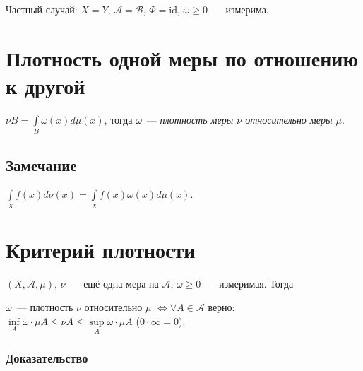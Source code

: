 \documentclass{article}
\begin{document}
            Частный случай: $X = Y$, $\mathcal{A} = \mathcal{B}$, $\Phi = \mathrm{id}$, $\omega \geqslant 0$~--- измерима.
            
    \newpage
    
    \section{Плотность одной меры по отношению к другой}
    
        $\nu B = \int\limits_B \omega(x) d \mu(x)$, тогда $\omega$~--- \textit{плотность меры $\nu$ относительно меры $\mu$}.
            
        \subsection{Замечание}
        
            $\int\limits_X f(x) d \nu(x) = \int\limits_X f(x) \omega(x) d \mu(x)$.
    
    \newpage
            
    \section{Критерий плотности}
    
        $(X, \mathcal{A}, \mu)$, $\nu$~--- ещё одна мера на $\mathcal{A}$, $\omega \geqslant 0$~--- измеримая. Тогда
        
        $\omega$~--- плотность $\nu$ относительно $\mu$ $\Longleftrightarrow \forall A \in \mathcal{A}$ верно: $\inf\limits_{A} \omega \cdot \mu A \leqslant \nu A \leqslant \sup\limits_{A} \omega \cdot \mu A$ ($0 \cdot \infty = 0$).
        
        \subsubsection{Доказательство}
        
\end{document}

